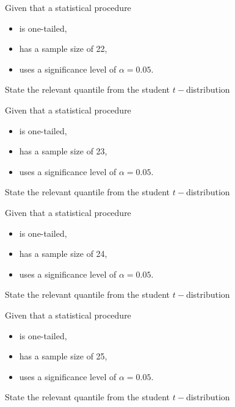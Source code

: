 \documentclass[12pt, a4paper]{report}
\theoremstyle{definition}
\theoremstyle{remark}
\begin{document}

	
	
	
	Given that a statistical procedure 
	\begin{itemize}
		\item is one-tailed,
		\item has a sample size of 22,
		\item uses a significance level of $\alpha = 0.05$.
	\end{itemize} \smallskip
	State the relevant quantile from the student $t-$distribution
	


	
	
	
	Given that a statistical procedure 
	\begin{itemize}
		\item is one-tailed,
		\item has a sample size of 23,
		\item uses a significance level of $\alpha = 0.05$.
	\end{itemize} \smallskip
	State the relevant quantile from the student $t-$distribution
	


	
	
	
	Given that a statistical procedure
	\begin{itemize}
		\item is one-tailed,
		\item has a sample size of 24,
		\item uses a significance level of $\alpha = 0.05$.
	\end{itemize} \smallskip
	State the relevant quantile from the student $t-$distribution
	


	
	
	
	Given that a statistical procedure 
	\begin{itemize}
		\item is one-tailed,
		\item has a sample size of 25,
		\item uses a significance level of $\alpha = 0.05$.
	\end{itemize} \smallskip
	State the relevant quantile from the student $t-$distribution
	

	
\end{document}
